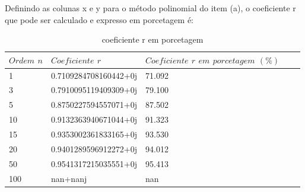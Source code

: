 \documentclass{article}
\begin{document}
\text Definindo as colunas x e y para o método polinomial do item (a), o coeficiente r que pode ser calculado e expresso em porcetagem é:
\begin{table}[h]
\centering
  \begin{tabular}{l|l|lll}
    $Ordem$ $n$ & $Coeficiente$ $r$ & $Coeficiente$ $r$ $em$ $porcetagem$ $(\%)$\\
    \hline
    1 & 0.7109284708160442+0j & 71.092\\
    
    3 & 0.7910095119409309+0j & 79.100\\
    
    5 & 0.8750227594557071+0j & 87.502 \\
    
    10 & 0.9132363940671044+0j & 91.323\\
    
    15 & 0.9353002361833165+0j  & 93.530\\
    
    20 & 0.9401289596912272+0j & 94.012\\
    
    50 & 0.9541317215035551+0j & 95.413\\
    
    100 & nan+nanj & nan\\
    \hline
  \end{tabular}
  \caption{coeficiente r em porcetagem}
\end{table}
\end{document}
